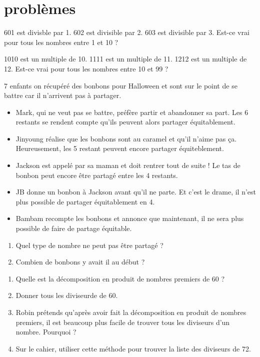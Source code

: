 \section{problèmes}


601 est divisble par 1. 602 est divisible par 2. 603 est divisible par 3. Est-ce vrai pour tous les nombres entre 1 et 10 ?


1010 est un multiple de 10. 1111 est un multiple de 11. 1212 est un multiple de 12. Est-ce vrai pour tous les nombres entre 10 et 99 ?


7 enfants on récupéré des bonbons pour Halloween et sont sur le point de se battre car il n'arrivent pas à partager.
\begin{itemize}
	\item Mark, qui ne veut pas se battre, préfère partir et abandonner sa part. Les 6 restants se rendent compte qu'ils peuvent alors partager équitablement.
	\item Jinyoung réalise que les bonbons sont au caramel et qu'il n'aime pas ça. Heureusement, les 5 restant peuvent encore partager équiteblement.
	\item Jackson est appelé par sa maman et doit rentrer tout de suite ! Le tas de bonbon peut encore être partagé entre les 4 restants.
	\item JB donne un bonbon à Jackson avant qu'il ne parte. Et c'est le drame, il n'est plus possible de partager équitablement en 4.
	\item Bambam recompte les bonbons et annonce que maintenant, il ne sera plus possible de faire de partage équitable.
\end{itemize}

\begin{enumerate}
	\item Quel type de nombre ne peut pas être partagé ? \dotfill
	\item Combien de bonbons y avait il au début ? 
\end{enumerate}

\newpage


\begin{enumerate}
	\item Quelle est la décomposition en produit de nombres premiers de 60 ?
	\item Donner tous les diviseurde de 60.
	\item Robin prétends qu'après avoir fait la décomposition en produit de nombres premiers, il est beaucoup plus facile de trouver tous les diviseurs d'un nombre. Pourquoi ?
	\item Sur le cahier, utiliser cette méthode pour trouver la liste des diviseurs de 72.
\end{enumerate}



